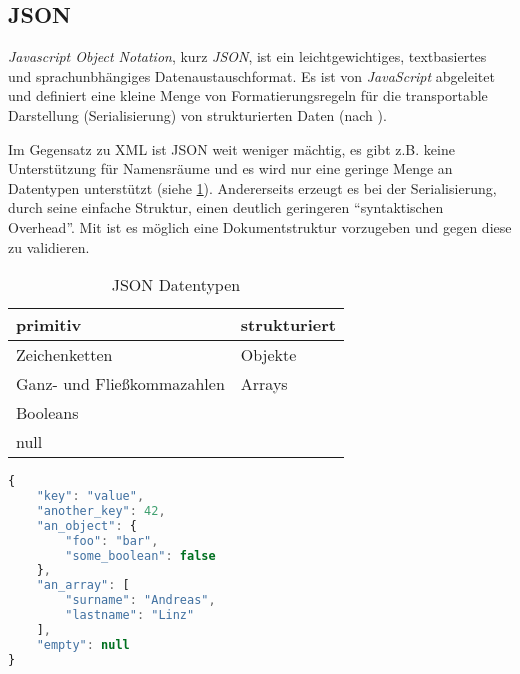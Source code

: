 \subsection{JSON}

\emph{Javascript Object Notation}, kurz \emph{JSON}, ist ein leichtgewichtiges, textbasiertes und sprachunbhängiges Datenaustauschformat. Es ist von \emph{JavaScript} abgeleitet und definiert eine kleine Menge von Formatierungsregeln für die transportable Darstellung (Serialisierung) von strukturierten Daten (nach \cite{JSONRFC}).

Im Gegensatz zu XML ist JSON weit weniger mächtig, es gibt z.B. keine Unterstützung für Namensräume und es wird nur eine geringe Menge an Datentypen unterstützt (siehe \cref{tab:jsonDatatypes}). Andererseits erzeugt es bei der Serialisierung, durch seine einfache Struktur, einen deutlich geringeren \enquote{syntaktischen Overhead}.
Mit  ist es möglich eine Dokumentstruktur vorzugeben und gegen diese zu validieren. 

\begin{table}[htb]
	\begin{longtable}{l l}
	\toprule
	\rowcolor{lightgray}
	\textbf{primitiv} 	& \textbf{strukturiert}\\
	\midrule
	Zeichenketten		& Objekte\\
	Ganz- und 
	Fließkommazahlen	& Arrays\\
	Booleans			& \\
	null				& \\
	\bottomrule
	\end{longtable}
	\caption{JSON Datentypen}
	\label{tab:jsonDatatypes}
\end{table}

%
%
\begin{minipage}{\textwidth}
	\begin{lstlisting}[language=JavaScript, caption=Minimalbeispiel für eine JSON-Datei]
{
	"key": "value",
	"another_key": 42,
	"an_object": {
		"foo": "bar",
		"some_boolean": false
	},
	"an_array": [
		"surname": "Andreas",
		"lastname": "Linz"
	],
	"empty": null
}
	\end{lstlisting}
\end{minipage}